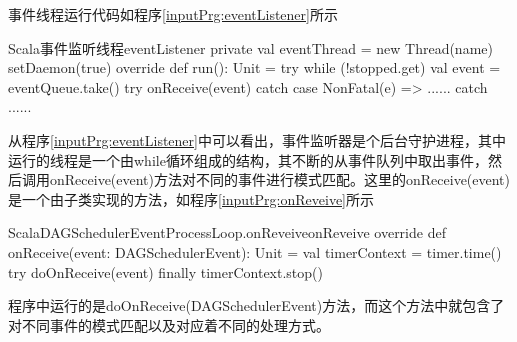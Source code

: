事件线程运行代码如程序\ref{inputPrg:eventListener}所示
\begin{codeInput}{Scala}{事件监听线程}{eventListener}
private val eventThread = new Thread(name) {
  setDaemon(true)	
  override def run(): Unit = {
    try {
      while (!stopped.get) {
        val event = eventQueue.take()
          try {
            onReceive(event)
          } catch {
            case NonFatal(e) => {
              ......
                }
              }
            }
          } catch {
            ......
        }
    }	
}
\end{codeInput}
从程序\ref{inputPrg:eventListener}中可以看出，事件监听器是个后台守护进程，其中运行的线程是一个由while循环组成的结构，其不断的从事件队列中取出事件，然后调用onReceive(event)方法对不同的事件进行模式匹配。这里的onReceive(event)是一个由子类实现的方法，如程序\ref{inputPrg:onReveive}所示
\begin{codeInput}{Scala}{DAGSchedulerEventProcessLoop.onReveive}{onReveive}
override def onReceive(event: DAGSchedulerEvent): Unit = {
  val timerContext = timer.time()
  try {
    doOnReceive(event)
  } finally {
    timerContext.stop()
  }
}
\end{codeInput}

程序中运行的是doOnReceive(DAGSchedulerEvent)方法，而这个方法中就包含了对不同事件的模式匹配以及对应着不同的处理方式。